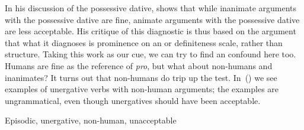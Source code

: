 \begin{exe}
\begin{xlist}
\begin{exe}
\begin{xlist}
\begin{exe}
\begin{xlist}
\begin{exe}
\begin{exe}
\begin{xlist}
\begin{exe}
\begin{xlist}
\begin{exe}
\begin{xlist}
\begin{exe}
\begin{xlist}
\begin{exe}
\begin{xlist}
\begin{exe}
\begin{xlist}
\begin{exe}
\begin{xlist}
\begin{exe}
\begin{xlist}
\begin{exe}
\begin{xlist}
 \z
\z 
		
In his discussion of the possessive dative, \cite{gafter14li} shows that while inanimate arguments with the possessive dative are fine, animate arguments with the possessive dative are less acceptable. His critique of this diagnostic is thus based on the argument that what it diagnoses is prominence on an  or definiteness scale, rather than structure. Taking this work as our cue, we can try to find an  confound here too. Humans are fine as the reference of \emph{pro}, but what about non-humans and inanimates? It turns out that non-humans do trip up the test. In~(\nextx) we see examples of unergative verbs with non-human arguments; the examples are ungrammatical, even though unergatives should have been acceptable.

 \begin{exe}
 \ex  Episodic, unergative, non-human, unacceptable 
 \begin{xlist} 
		

		
		

				
 \z
\z 


\end{xlist}
\end{exe}
\end{xlist}
\end{exe}
\end{xlist}
\end{exe}
\end{xlist}
\end{exe}
\end{xlist}
\end{exe}
\end{xlist}
\end{exe}
\end{xlist}
\end{exe}
\end{xlist}
\end{exe}
\end{xlist}
\end{exe}
\end{xlist}
\end{exe}
\end{exe}
\end{xlist}
\end{exe}
\end{xlist}
\end{exe}
\end{xlist}
\end{exe}
